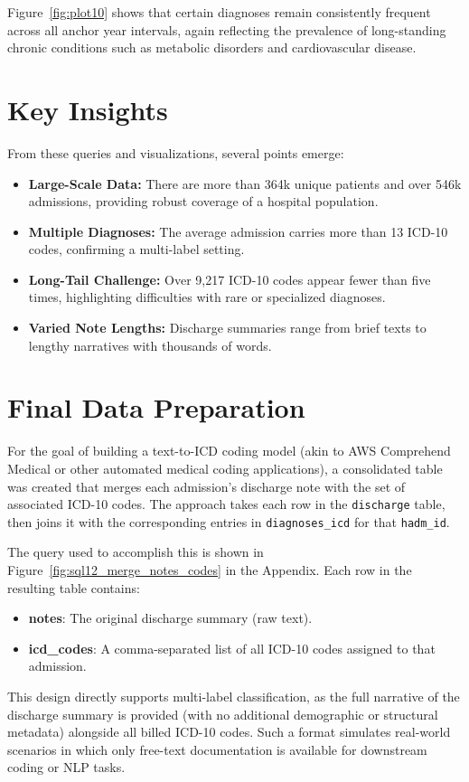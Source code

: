 \noindent
Figure~\ref{fig:plot10} shows that certain diagnoses remain consistently frequent across all anchor year intervals, again reflecting the prevalence of long-standing chronic conditions such as metabolic disorders and cardiovascular disease.

\section{Key Insights}
\noindent
From these queries and visualizations, several points emerge:
\begin{itemize}
    \item \textbf{Large-Scale Data:} There are more than 364k unique patients and over 546k admissions, providing robust coverage of a hospital population.
    \item \textbf{Multiple Diagnoses:} The average admission carries more than 13 ICD-10 codes, confirming a multi-label setting.
    \item \textbf{Long-Tail Challenge:} Over 9,217 ICD-10 codes appear fewer than five times, highlighting difficulties with rare or specialized diagnoses.
    \item \textbf{Varied Note Lengths:} Discharge summaries range from brief texts to lengthy narratives with thousands of words.
\end{itemize}

\section{Final Data Preparation}
\label{sec:final_data_preparation}
\noindent
For the goal of building a text-to-ICD coding model (akin to AWS Comprehend Medical or other automated medical coding applications), a consolidated table was created that merges each admission’s discharge note with the set of associated ICD-10 codes. The approach takes each row in the \texttt{discharge} table, then joins it with the corresponding entries in \texttt{diagnoses\_icd} for that \texttt{hadm\_id}. 

\vspace{5pt}
\noindent
The query used to accomplish this is shown in Figure~\ref{fig:sql12_merge_notes_codes} in the Appendix. Each row in the resulting table contains:
\begin{itemize}
    \item \textbf{notes}: The original discharge summary (raw text).
    \item \textbf{icd\_codes}: A comma-separated list of all ICD-10 codes assigned to that admission.
\end{itemize}

\vspace{5pt}
\noindent
This design directly supports multi-label classification, as the full narrative of the discharge summary is provided (with no additional demographic or structural metadata) alongside all billed ICD-10 codes. Such a format simulates real-world scenarios in which only free-text documentation is available for downstream coding or NLP tasks.
